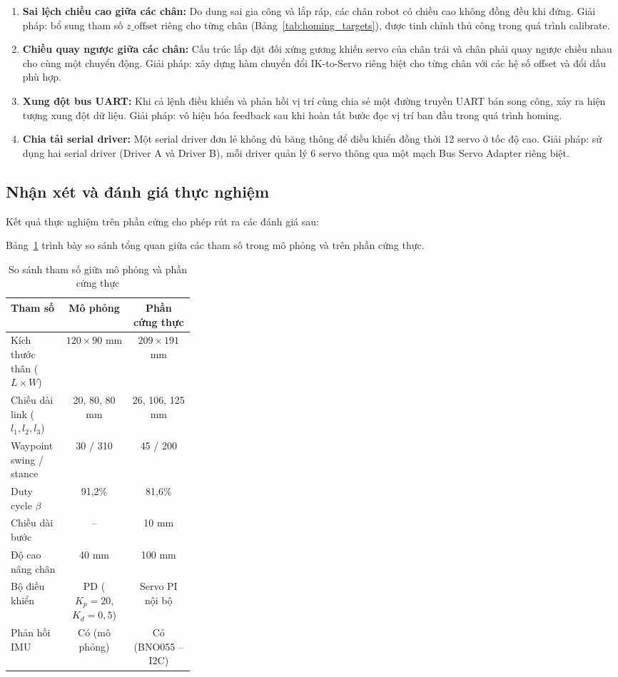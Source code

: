 \begin{enumerate}
    \item \textbf{Sai lệch chiều cao giữa các chân:} Do dung sai gia công và lắp ráp, các chân robot có chiều cao không đồng đều khi đứng. Giải pháp: bổ sung tham số $z\_\text{offset}$ riêng cho từng chân (Bảng~\ref{tab:homing_targets}), được tinh chỉnh thủ công trong quá trình calibrate.

    \item \textbf{Chiều quay ngược giữa các chân:} Cấu trúc lắp đặt đối xứng gương khiến servo của chân trái và chân phải quay ngược chiều nhau cho cùng một chuyển động. Giải pháp: xây dựng hàm chuyển đổi IK-to-Servo riêng biệt cho từng chân với các hệ số offset và đổi dấu phù hợp.

    \item \textbf{Xung đột bus UART:} Khi cả lệnh điều khiển và phản hồi vị trí cùng chia sẻ một đường truyền UART bán song công, xảy ra hiện tượng xung đột dữ liệu. Giải pháp: vô hiệu hóa feedback sau khi hoàn tất bước đọc vị trí ban đầu trong quá trình homing.

    \item \textbf{Chia tải serial driver:} Một serial driver đơn lẻ không đủ băng thông để điều khiển đồng thời 12 servo ở tốc độ cao. Giải pháp: sử dụng hai serial driver (Driver A và Driver B), mỗi driver quản lý 6 servo thông qua một mạch Bus Servo Adapter riêng biệt.
\end{enumerate}

\subsection{Nhận xét và đánh giá thực nghiệm}

Kết quả thực nghiệm trên phần cứng cho phép rút ra các đánh giá sau:

Bảng~\ref{tab:sim_vs_hw} trình bày so sánh tổng quan giữa các tham số trong mô phỏng và trên phần cứng thực.

\begin{table}[H]
\centering
\caption{So sánh tham số giữa mô phỏng và phần cứng thực}
\label{tab:sim_vs_hw}
\renewcommand{\arraystretch}{1.3}
\begin{tabular}{|p{0.3\linewidth}|c|c|}
\hline
\textbf{Tham số} & \textbf{Mô phỏng} & \textbf{Phần cứng thực} \\ \hline
Kích thước thân ($L \times W$) & $120 \times 90$ mm & $209 \times 191$ mm \\ \hline
Chiều dài link ($l_1, l_2, l_3$) & 20, 80, 80 mm & 26, 106, 125 mm \\ \hline
Waypoint swing / stance & 30 / 310 & 45 / 200 \\ \hline
Duty cycle $\beta$ & 91,2\% & 81,6\% \\ \hline
Chiều dài bước & -- & 10 mm \\ \hline
Độ cao nâng chân & 40 mm & 100 mm \\ \hline
Bộ điều khiển & PD ($K_p=20$, $K_d=0,5$) & Servo PI nội bộ \\ \hline
Phản hồi IMU & Có (mô phỏng) & Có (BNO055 -- I2C) \\ \hline
\end{tabular}
\end{table}

